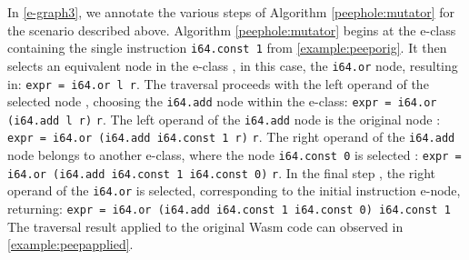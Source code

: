 In \autoref{e-graph3}, we annotate the various steps of Algorithm \ref{peephole:mutator} 
for the scenario  described above. Algorithm \ref{peephole:mutator} begins at the e-class containing the single instruction \texttt{i64.const 1} from \autoref{example:peeporig}. 
It then selects an equivalent node in the e-class , in this case, the \texttt{i64.or} node, resulting in:
{\texttt{expr = i64.or l r}}.
The traversal proceeds with the left operand of the selected node , choosing the \texttt{i64.add} node within the e-class: 
{\texttt{expr = i64.or (i64.add l r)} \texttt{r}}.
The left operand of the \texttt{i64.add} node is the original node : 
{\texttt{expr = i64.or (i64.add i64.const 1 r)} \texttt{r}}.
The right operand of the \texttt{i64.add} node belongs to another e-class, where the node \texttt{i64.const 0} is selected :
{\texttt{expr = i64.or (i64.add i64.const 1 i64.const 0)} \texttt{r}}.
In the final step , the right operand of the \texttt{i64.or} is selected, corresponding to the initial instruction e-node, returning:
{\texttt{expr = i64.or (i64.add i64.const 1 i64.const 0)\ i64.const 1}}
The traversal result applied to the original Wasm code can observed in \autoref{example:peepapplied}. 





